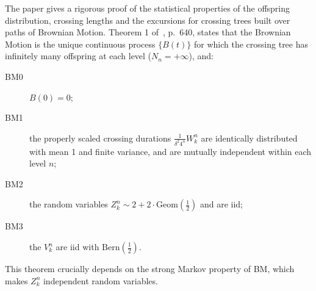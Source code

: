 The paper \cite{ECP1673} gives a rigorous proof of the statistical properties of
the offspring distribution, crossing lengths and the excursions for crossing trees
built over paths of Brownian Motion. Theorem 1 of~\cite{ECP1673}, p.~640, states that
the Brownian Motion is the unique continuous process $\{B(t)\}$ for which the crossing
tree has infinitely many offspring at each level ($N_n = +\infty$), and: \begin{description}
    \item[BM0] $B(0) = 0$;
    \item[BM1] the properly scaled crossing durations $\tfrac{1}{\delta^2 4^n} W_k^n$
    are identically distributed with mean 1 and finite variance, and are mutually
    independent within each level $n$;
    \item[BM2] the random variables $Z_k^n\sim 2+2\cdot\text{Geom}(\frac{1}{2})$ and are iid;
    \item[BM3] the $V_k^n$ are iid with $\text{Bern}(\tfrac{1}{2})$.
\end{description}
This theorem crucially depends on the strong Markov property of BM, which makes $Z_k^n$
independent random variables.


